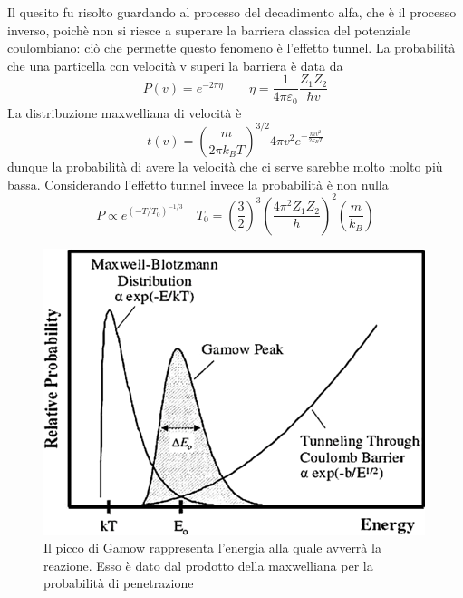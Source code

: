 \documentclass[a4paper,11pt]{article}
\begin{document}
Il quesito fu risolto guardando al processo del decadimento alfa, che è il processo inverso, poichè non si riesce a superare la barriera classica del potenziale coulombiano: ciò che permette questo fenomeno è l'effetto tunnel.
La probabilità che una particella con velocità v superi la barriera è data da
$$P(v)=e^{-2\pi \eta}\qquad \eta=\frac{1}{4\pi \varepsilon_0}\frac{Z_1Z_2}{\hbar v}$$
La distribuzione maxwelliana di velocità è
$$t(v)=\left(\frac{m}{2\pi k_B T}\right)^{3/2}4\pi v^2 e^{-\frac{mv^2}{2k_BT}}$$
dunque la probabilità di avere la velocità che ci serve sarebbe molto molto più bassa. Considerando l'effetto tunnel invece la probabilità è non nulla
$$P\propto e^{(-T/T_0)^{-1/3}}\quad T_0=\left(\frac{3}{2}\right)^3\left(\frac{4\pi^2 Z_1Z_2}{h}\right)^2\left(\frac{m}{k_B}\right)$$
\begin{figure}[h!]
    \centering
    \includegraphics{prob.png}
    \caption{Il picco di Gamow rappresenta l'energia alla quale avverrà la reazione. Esso è dato dal prodotto della maxwelliana per la probabilità di penetrazione}
\end{figure}
\end{document}
